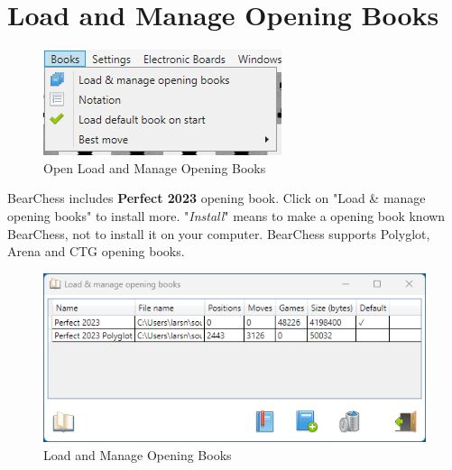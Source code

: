 \documentclass[11pt,a4paper]{article}
\begin{document}
	\section{Load and Manage Opening Books} \label{OpeningBooks}
	
	\begin{figure}[H]
		\centering
		\includegraphics[scale=1.0]{books.png}
		\caption{Open Load and Manage Opening Books  }
		\label{fig:LoadManageBooks1}
	\end{figure}
	
	BearChess includes \textbf{Perfect 2023} opening book. Click on "Load \& manage opening books" to install more. "\textit{Install}" means to make a opening book known BearChess, not to install it on your computer. BearChess supports Polyglot, Arena and CTG opening books.\\
	
	\begin{figure}[H]
		\centering
		\includegraphics[scale=1.0]{LoadManageBooks2.png}
		\caption{Load and Manage Opening Books  }
		\label{fig:LoadManageBooks2}
	\end{figure}
	
\end{document}
